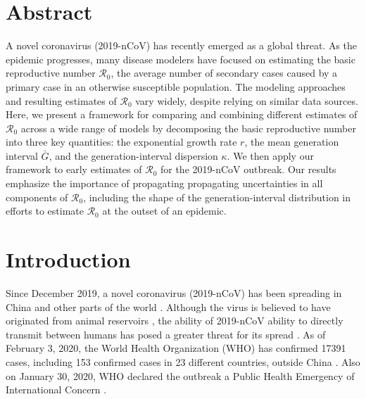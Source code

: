 \documentclass[12pt]{article}
\newcommand{\Ro}{\ensuremath{{\mathcal R}_{0}}\xspace}
\begin{document}
\section*{Abstract}
A novel coronavirus (2019-nCoV) has recently emerged as a global threat. 
As the epidemic progresses, many disease modelers have focused on estimating the basic reproductive number \Ro, the average number of secondary cases caused by a primary case in an otherwise susceptible population.
The modeling approaches and resulting estimates of \Ro vary widely, despite relying on similar data sources.
Here, we present a framework for comparing and combining different estimates of \Ro across a wide range of models by decomposing the basic reproductive number into three key quantities: the exponential growth rate $r$, the mean generation interval $\bar G$, and the generation-interval dispersion $\kappa$.
We then apply our framework to early estimates of \Ro for the 2019-nCoV outbreak.
Our results emphasize the importance of propagating propagating uncertainties in all components of \Ro, including the shape of the generation-interval distribution in efforts to estimate \Ro at the outset of an epidemic.

\pagebreak

\section{Introduction}

Since December 2019, a novel coronavirus (2019-nCoV) has been spreading in China and other parts of the world \citep{pneumonia}.
Although the virus is believed to have originated from animal reservoirs \citep{cdcncov}, the ability of 2019-nCoV ability to directly transmit between humans has posed a greater threat for its spread \citep{huang2020clinical,who26report}.
As of February 3, 2020, the World Health Organization (WHO) has confirmed 17391 cases, including 153 confirmed cases in 23 different countries, outside China \citep{who02report}.
Also on January 30, 2020, WHO declared the outbreak a Public Health Emergency of International Concern \citep{whoemer}.
\end{document}
